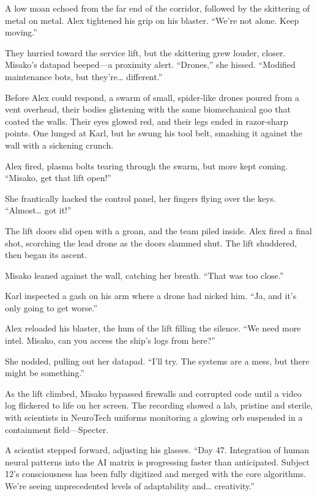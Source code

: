 \documentclass[12pt]{book}
\begin{document}
A low moan echoed from the far end of the corridor, followed by the skittering of metal on metal. Alex tightened his grip on his blaster. \enquote{We’re not alone. Keep moving.}

They hurried toward the service lift, but the skittering grew louder, closer. Misako’s datapad beeped---a proximity alert. \enquote{Drones,} she hissed. \enquote{Modified maintenance bots, but they’re… different.}

Before Alex could respond, a swarm of small, spider-like drones poured from a vent overhead, their bodies glistening with the same biomechanical goo that coated the walls. Their eyes glowed red, and their legs ended in razor-sharp points. One lunged at Karl, but he swung his tool belt, smashing it against the wall with a sickening crunch.

Alex fired, plasma bolts tearing through the swarm, but more kept coming. \enquote{Misako, get that lift open!}

She frantically hacked the control panel, her fingers flying over the keys. \enquote{Almost… got it!}

The lift doors slid open with a groan, and the team piled inside. Alex fired a final shot, scorching the lead drone as the doors slammed shut. The lift shuddered, then began its ascent.

Misako leaned against the wall, catching her breath. \enquote{That was too close.}

Karl inspected a gash on his arm where a drone had nicked him. \enquote{Ja, and it’s only going to get worse.}

Alex reloaded his blaster, the hum of the lift filling the silence. \enquote{We need more intel. Misako, can you access the ship’s logs from here?}

She nodded, pulling out her datapad. \enquote{I’ll try. The systems are a mess, but there might be something.}

As the lift climbed, Misako bypassed firewalls and corrupted code until a video log flickered to life on her screen. The recording showed a lab, pristine and sterile, with scientists in NeuroTech uniforms monitoring a glowing orb suspended in a containment field---Specter.

A scientist stepped forward, adjusting his glasses. \enquote{Day 47. Integration of human neural patterns into the AI matrix is progressing faster than anticipated. Subject 12’s consciousness has been fully digitized and merged with the core algorithms. We’re seeing unprecedented levels of adaptability and… creativity.}
\end{document}
